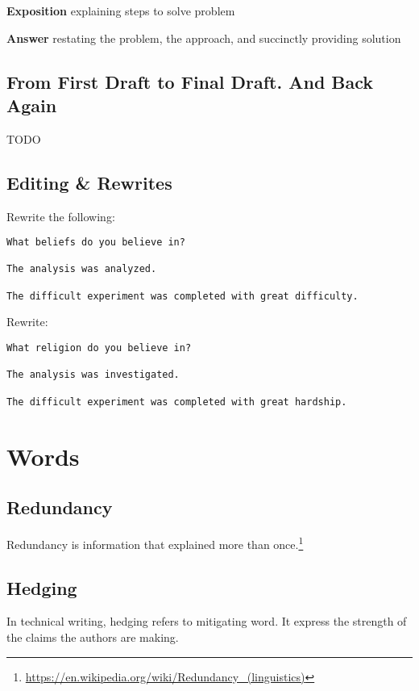 \documentclass[10pt,a4paper]{book}
\begin{document}
\textbf{Exposition} explaining steps to solve problem

\textbf{Answer} restating the problem, the approach, and succinctly providing solution


\section{From First Draft to Final Draft. And Back Again}

\color{BrickRed}TODO\color{black}


\section{Editing \& Rewrites}

Rewrite the following:
\begin{verbatim}
What beliefs do you believe in?

The analysis was analyzed.

The difficult experiment was completed with great difficulty.
\end{verbatim}

Rewrite:

\begin{verbatim}
What religion do you believe in?

The analysis was investigated.

The difficult experiment was completed with great hardship.
\end{verbatim}

\chapter{Words}



\section{Redundancy}\label{Redundancy}

Redundancy is information that explained more than once.\footnote{\url{https://en.wikipedia.org/wiki/Redundancy_(linguistics)}}



\section{Hedging}\label{Hedging}

In technical writing, hedging refers to mitigating word. It express the strength of the claims the authors are making.
\end{document}
